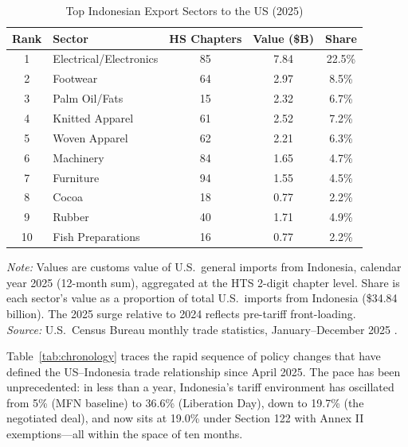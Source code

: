 \documentclass[12pt,a4paper]{article}
\begin{document}
\begin{table}[h!]
\centering
\caption{Top Indonesian Export Sectors to the US (2025)}
\begin{tabular}{clccc}
\toprule
\textbf{Rank} & \textbf{Sector} & \textbf{HS Chapters} & \textbf{Value (\$B)} & \textbf{Share} \\
\midrule
1 & Electrical/Electronics & 85 & 7.84 & 22.5\% \\
2 & Footwear & 64 & 2.97 & 8.5\% \\
3 & Palm Oil/Fats & 15 & 2.32 & 6.7\% \\
4 & Knitted Apparel & 61 & 2.52 & 7.2\% \\
5 & Woven Apparel & 62 & 2.21 & 6.3\% \\
6 & Machinery & 84 & 1.65 & 4.7\% \\
7 & Furniture & 94 & 1.55 & 4.5\% \\
8 & Cocoa & 18 & 0.77 & 2.2\% \\
9 & Rubber & 40 & 1.71 & 4.9\% \\
10 & Fish Preparations & 16 & 0.77 & 2.2\% \\
\bottomrule
\end{tabular}
\par\smallskip
\begin{minipage}{\linewidth}
\footnotesize
\textit{Note:} Values are customs value of U.S.\ general imports from Indonesia, calendar year 2025 (12-month sum), aggregated at the HTS 2-digit chapter level. Share is each sector's value as a proportion of total U.S.\ imports from Indonesia (\$34.84 billion). The 2025 surge relative to 2024 reflects pre-tariff front-loading.\\
\textit{Source:} U.S.\ Census Bureau monthly trade statistics, January--December 2025 \cite{census2024}.
\end{minipage}
\label{tab:topexports}
\end{table}

Table~\ref{tab:chronology} traces the rapid sequence of policy changes that have defined the US--Indonesia trade relationship since April 2025. The pace has been unprecedented: in less than a year, Indonesia's tariff environment has oscillated from 5\% (MFN baseline) to 36.6\% (Liberation Day), down to 19.7\% (the negotiated deal), and now sits at 19.0\% under Section 122 with Annex II exemptions---all within the space of ten months.
\end{document}
